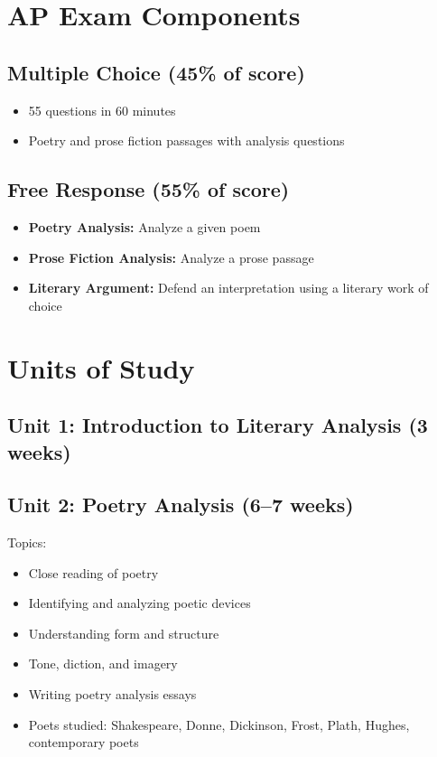 \documentclass[12pt,oneside]{book}
\begin{document}
\section{AP Exam Components}
\subsection*{Multiple Choice (45\% of score)}
\begin{itemize}[leftmargin=2em]
    \item 55 questions in 60 minutes
    \item Poetry and prose fiction passages with analysis questions
\end{itemize}

\subsection*{Free Response (55\% of score)}
\begin{itemize}[leftmargin=2em]
    \item \textbf{Poetry Analysis:} Analyze a given poem
    \item \textbf{Prose Fiction Analysis:} Analyze a prose passage
    \item \textbf{Literary Argument:} Defend an interpretation using a literary work of choice
\end{itemize}

\section{Units of Study}
\subsection*{Unit 1: Introduction to Literary Analysis (3 weeks)}

\subsection*{Unit 2: Poetry Analysis (6--7 weeks)}
Topics:
\begin{itemize}[leftmargin=2em]
    \item Close reading of poetry
    \item Identifying and analyzing poetic devices
    \item Understanding form and structure
    \item Tone, diction, and imagery
    \item Writing poetry analysis essays
    \item Poets studied: Shakespeare, Donne, Dickinson, Frost, Plath, Hughes, contemporary poets
\end{itemize}
\end{document}
